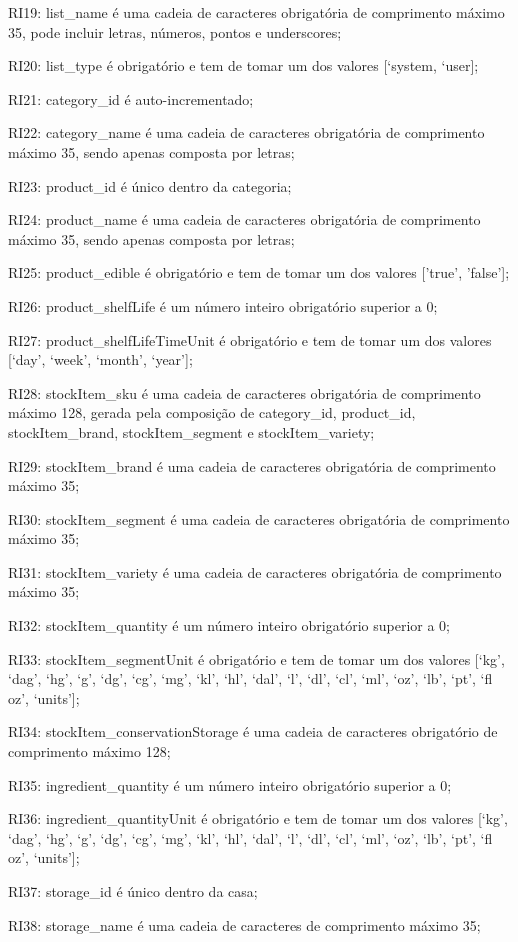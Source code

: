 \begin{description}
	\item RI19: list\_name é uma cadeia de caracteres obrigatória de comprimento máximo 35, pode incluir letras, números, pontos e underscores;
	\item RI20: list\_type é obrigatório e tem de tomar um dos valores [‘system, ‘user];
	\item RI21: category\_id é auto-incrementado;
	\item RI22: category\_name é uma cadeia de caracteres obrigatória de comprimento máximo 35, sendo apenas composta por letras;
	\item RI23: product\_id é único dentro da categoria;
	\item RI24: product\_name é uma cadeia de caracteres obrigatória de comprimento máximo 35, sendo apenas composta por letras;
	\item RI25: product\_edible é obrigatório e tem de tomar um dos valores ['true', 'false'];
	\item RI26: product\_shelfLife é um número inteiro obrigatório superior a 0;
	\item RI27: product\_shelfLifeTimeUnit é obrigatório e tem de tomar um dos valores [‘day’, ‘week’, ‘month’, ‘year’];
	\item RI28: stockItem\_sku é uma cadeia de caracteres obrigatória de comprimento máximo 128, gerada pela composição de category\_id, product\_id, stockItem\_brand, stockItem\_segment e stockItem\_variety;
	\item RI29: stockItem\_brand é uma cadeia de caracteres obrigatória de comprimento máximo 35;
	\item RI30: stockItem\_segment é uma cadeia de caracteres obrigatória de comprimento máximo 35;
	\item RI31: stockItem\_variety é uma cadeia de caracteres obrigatória de comprimento máximo 35;
	\item RI32: stockItem\_quantity é um número inteiro obrigatório superior a 0;
	\item RI33: stockItem\_segmentUnit é obrigatório e tem de tomar um dos valores [‘kg’, ‘dag’, ‘hg’, ‘g’, ‘dg’, ‘cg’, ‘mg’, ‘kl’, ‘hl’, ‘dal’, ‘l’, ‘dl’, ‘cl’, ‘ml’, ‘oz’, ‘lb’, ‘pt’, ‘fl oz’, ‘units’];
	\item RI34: stockItem\_conservationStorage é uma cadeia de caracteres obrigatório de comprimento máximo 128;
	\item RI35: ingredient\_quantity é um número inteiro obrigatório superior a 0;
	\item RI36: ingredient\_quantityUnit é obrigatório e tem de tomar um dos valores [‘kg’, ‘dag’, ‘hg’, ‘g’, ‘dg’, ‘cg’, ‘mg’, ‘kl’, ‘hl’, ‘dal’, ‘l’, ‘dl’, ‘cl’, ‘ml’, ‘oz’, ‘lb’, ‘pt’, ‘fl oz’, ‘units’];
	\item RI37: storage\_id é único dentro da casa;
	\item RI38: storage\_name é uma cadeia de caracteres de comprimento máximo 35;
\end{description}

